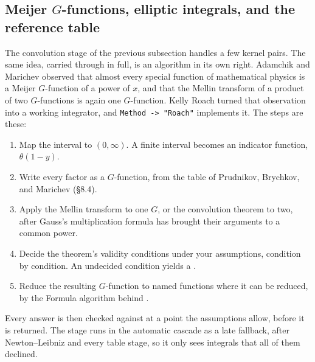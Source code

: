 
\subsection{Meijer \texorpdfstring{\(G\)}{G}-functions, elliptic integrals, and the reference table}
\label{ssec:calc-meijer}

The convolution stage of the previous subsection handles a few kernel pairs. The
same idea, carried through in full, is an algorithm in its own right. Adamchik and
Marichev observed that almost every special function of mathematical physics is a
Meijer \(G\)-function of a power of \(x\), and that the Mellin transform of a product
of two \(G\)-functions is again one \(G\)-function. Kelly Roach
turned that observation into a working integrator, and \texttt{Method -> "Roach"}
implements it. The steps are these:
\begin{enumerate}
\item Map the interval to \((0,\infty)\). A finite interval becomes an indicator
function, \(\theta(1-y)\).
\item Write every factor as a \(G\)-function, from the table of Prudnikov,
Brychkov, and Marichev (\S8.4).
\item Apply the Mellin transform to one \(G\), or the convolution theorem to two,
after Gauss's multiplication formula has brought their arguments to a common power.
\item Decide the theorem's validity conditions under your assumptions, condition by
condition. An undecided condition yields a .
\item Reduce the resulting \(G\)-function to named functions where it can be
reduced, by the Formula algorithm behind .
\end{enumerate}
Every answer is then checked against  at a point the assumptions
allow, before it is returned. The stage runs in the automatic cascade as a late
fallback, after Newton--Leibniz and every table stage, so it only sees integrals
that all of them declined.

